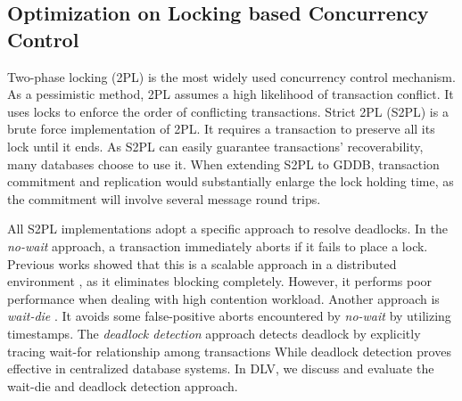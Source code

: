 \documentclass[conference]{IEEEtran}
\begin{document}
\subsection{Optimization on Locking based Concurrency Control}
Two-phase locking (2PL) is the most widely used concurrency control mechanism.
As a pessimistic method, 2PL assumes a high likelihood of transaction conflict.
It uses locks to enforce the order of conflicting transactions.
Strict 2PL (S2PL) is a brute force implementation of 2PL. 
It requires a transaction to preserve all its lock until it ends.
As S2PL can easily guarantee transactions' recoverability, many databases choose to use it.
When extending S2PL to GDDB, transaction commitment and replication would substantially enlarge the lock holding time,
as the commitment will involve several message round trips.

All S2PL implementations adopt a specific approach to resolve deadlocks.
In the \emph{no-wait}
\cite{EvaluationOfCC:journals/pvldb/HardingAPS17}
approach, a transaction immediately aborts if it fails to place a lock.
Previous works showed that this is a scalable approach in a distributed environment \cite{EvaluationCC1000Cores:journals/pvldb/YuBPDS14}\cite{EvaluationOfCC:journals/pvldb/HardingAPS17},
as it eliminates blocking completely.
However, it performs poor performance when dealing with high contention workload.
Another approach is \emph{wait-die} \cite{LockNoWait:journals/csur/BernsteinG81}. 
It avoids some false-positive aborts encountered by \emph{no-wait} by utilizing timestamps.
The \emph{deadlock detection} approach \cite{LockCC:conf/ds/GrayLPT76} detects deadlock by explicitly tracing wait-for relationship among transactions
While deadlock detection proves effective in centralized database systems\cite{MySQL}\cite{PostgreSQL}.
In DLV, we discuss and evaluate the wait-die and deadlock detection approach.
\end{document}

